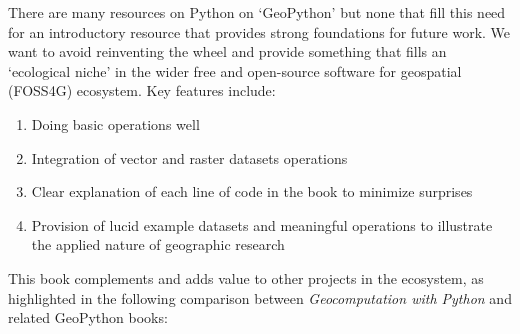 \documentclass[
  letterpaper,
]{krantz}
\providecommand{\tightlist}{%
  \setlength{\itemsep}{0pt}\setlength{\parskip}{0pt}}\usepackage{longtable,booktabs,array}
\begin{document}
There are many resources on Python on `GeoPython' but none that fill
this need for an introductory resource that provides strong foundations
for future work. We want to avoid reinventing the wheel and provide
something that fills an `ecological niche' in the wider free and
open-source software for geospatial (FOSS4G) ecosystem. Key features
include:

\begin{enumerate}
\def\labelenumi{\arabic{enumi}.}
\tightlist
\item
  Doing basic operations well
\item
  Integration of vector and raster datasets operations
\item
  Clear explanation of each line of code in the book to minimize
  surprises
\item
  Provision of lucid example datasets and meaningful operations to
  illustrate the applied nature of geographic research
\end{enumerate}

This book complements and adds value to other projects in the ecosystem,
as highlighted in the following comparison between \emph{Geocomputation
with Python} and related GeoPython books:
\end{document}
